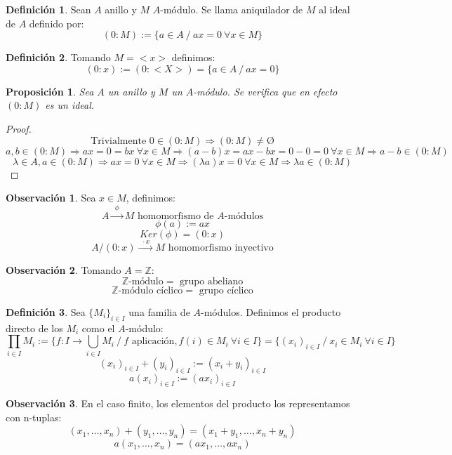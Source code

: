 \documentclass{article}
\theoremstyle{theorem-style}  %
\newtheorem{proposition}[theorem]{Proposición}
\theoremstyle{definition}
\newtheorem{definition}{Definición}[section]
\newtheorem*{observation}{Observación} %
\theoremstyle{example-style}
\begin{document}
\begin{definition}
	Sean $A$ anillo y $M$ $A$-módulo. Se llama aniquilador de $M$ al ideal de $A$ definido por:
	\[(0:M):=\{a\in A \ / \ ax=0 \  \forall x \in M\}\]
\end{definition}

\begin{definition}
	Tomando $M=<x>$ definimos:
	\[(0:x):=(0:<X>)=\{a\in A \ / \ ax=0\}\]
\end{definition}

\begin{proposition}
	Sea $A$ un anillo y $M$ un $A$-módulo. Se verifica que en efecto $(0:M)$ es un ideal.
\end{proposition}

\begin{proof}
	\[ \text{Trivialmente } 0 \in (0:M) \Rightarrow (0:M) \neq \text{\O}\]
	\[ a,b \in (0:M) \Rightarrow ax=0=bx \ \forall x \in M \Rightarrow (a-b)x=ax-bx=0-0=0 \ \forall x \in M \Rightarrow a-b \in (0:M) \]
	\[ \lambda \in A, a \in (0:M) \Rightarrow ax=0 \ \forall x \in M \Rightarrow (\lambda a)x=0 \ \forall x \in M \Rightarrow \lambda a \in (0:M) \]
\end{proof}

\begin{observation}
	Sea $x \in M$, definimos:
	\[ A\xrightarrow{\ \ \phi \ \ } M \text{ homomorfismo de $A$-módulos}\]
	\[ \phi(a):=ax\]
	\[ Ker(\phi)=(0:x)\]
	\[A/(0:x)\xrightarrow{\ \ \cdot x\ \ }M \text{ homomorfismo inyectivo}\]
\end{observation}

\begin{observation}
	Tomando $A=\mathbb{Z}$:
	\[ \mathbb{Z}\text{-módulo}=\text{ grupo abeliano}\]
	\[ \mathbb{Z}\text{-módulo cíclico}=\text{ grupo cíclico}\]
\end{observation}

\begin{definition}
	Sea $\{M_i\}_{i\in I}$ una familia de $A$-módulos. Definimos el producto directo de los $M_i$ como el $A$-módulo:
	\[ \prod_{i\in I}M_i := \{f:I\rightarrow\bigcup_{i\in I}M_i \ / \ \text{$f$ aplicación}, f(i)\in M_i \ \forall i \in I\} = \{(x_i)_{i\in I} \ / \ x_i \in M_i \ \forall i \in I\}\]
	\[(x_i)_{i\in I} + (y_i)_{i\in I} := (x_i + y_i)_{i\in I}\]
	\[a(x_i)_{i\in I} := (ax_i)_{i\in I}\]
\end{definition}

\begin{observation}
	En el caso finito, los elementos del producto los representamos con n-tuplas:
	\[(x_1,\dots,x_n)+(y_1,\dots,y_n)=(x_1+y_1,\dots,x_n+y_n)\]
	\[a(x_1,\dots,x_n)=(ax_1,\dots,ax_n)\]
\end{observation}
\end{document}
